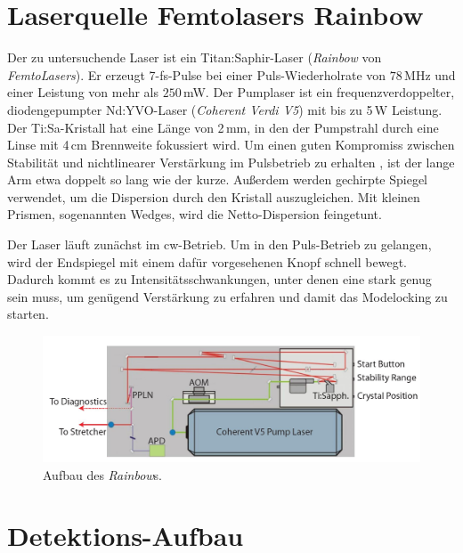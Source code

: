 \documentclass[bachelor,       %
               twoside,        %
               BCOR10mm,       %
               liststotoc,nomtotoc,bibtotoc, %
               english,ngerman, %
               final,          %
               ]{GAUBM}
\begin{document}
\section{Laserquelle Femtolasers Rainbow}
Der zu untersuchende Laser ist ein Titan:Saphir-Laser (\textit{Rainbow} von \textit{FemtoLasers}).
Er erzeugt 7-fs-Pulse bei einer Puls-Wiederholrate von $78\,$MHz und einer Leistung von mehr als $250\,$mW.
Der Pumplaser ist ein frequenzverdoppelter, diodengepumpter Nd:YVO-Laser (\textit{Coherent Verdi V5}) mit bis zu 5\,W Leistung.
Der Ti:Sa-Kristall hat eine Länge von 2\,mm, in den der Pumpstrahl durch eine Linse mit 4\,cm Brennweite fokussiert wird.
Um einen guten Kompromiss zwischen Stabilität und nichtlinearer Verstärkung im Pulsbetrieb zu erhalten \cite{stingl_sub-10-fs_1995}, ist der lange Arm etwa doppelt so lang wie der kurze.
Außerdem werden gechirpte Spiegel verwendet, um die Dispersion durch den Kristall auszugleichen.
Mit kleinen Prismen, sogenannten Wedges, wird die Netto-Dispersion feingetunt.

Der Laser läuft zunächst im cw-Betrieb.
Um in den Puls-Betrieb zu gelangen, wird der Endspiegel mit einem dafür vorgesehenen Knopf schnell bewegt.
Dadurch kommt es zu Intensitätsschwankungen, unter denen eine stark genug sein muss, um genügend Verstärkung zu erfahren und damit das Modelocking zu starten.
\begin{figure}[!htb]
	\centering
	\includegraphics[width=\textwidth]{figures/rainbow2.JPG}
	\caption{Aufbau des \textit{Rainbow}s\protect\footnotemark.}
	\label{fig:rainbow}
\end{figure}
\section{Detektions-Aufbau}
\end{document}
